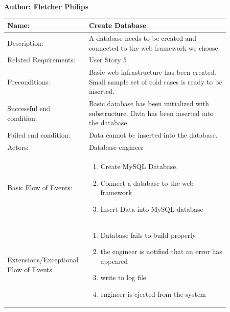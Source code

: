 \documentclass[11pt]{article}
\begin{document}
\begin{table}[!ht]
\begin{center}
\textbf{Author: Fletcher Philips}
\vspace*{1em}

\begin{tabular}{p{0.30\linewidth}p{0.60\linewidth}}
	Name: & Create Database\\\hline
	Description: & A database needs to be created and connected to the web framework we choose\\\hline
	Related Requirements:& User Story 5\\\hline
	Preconditions:& Basic web infrastructure has been created. Small sample set of cold cases is ready to be inserted.\\\hline
	Successful end condition:& Basic database has been initialized with substructure. Data has been inserted into the database.\\\hline
	Failed end condition:& Data cannot be inserted into the database.\\\hline
	Actors:& Database engineer\\\hline
	Basic Flow of Events: & \begin{enumerate}
	\item Create MySQL Database.
	\item Connect a database to the web framework
	\item Insert Data into MySQL database
	\end{enumerate}\\\hline
	Extensions/Exceptional Flow of Events & \begin{enumerate}
	\item Database fails to build properly
	\item the engineer is notified that an error has appeared
	\item write to log file
	\item engineer is ejected from the system
	\end{enumerate}
\end{tabular}
\label{des:create_database}	
\end{center}
\end{table}
\end{document}
